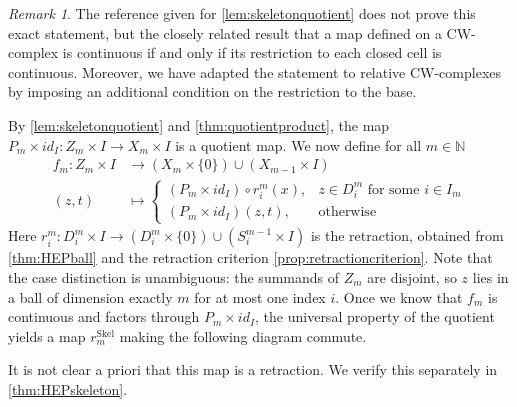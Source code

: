 \documentclass[11pt, a4paper, english]{article}
\theoremstyle{plain}
\theoremstyle{definition}
\theoremstyle{remark}
\newtheorem{remark}[theorem]{Remark}
\numberwithin{equation}{section}
\numberwithin{theorem}{section}
\begin{document}
\begin{remark}
The reference given for \cref{lem:skeletonquotient} does not prove this exact statement, but the closely related result that a map defined on a CW-complex is continuous if and only if its restriction to each closed cell is continuous. Moreover, we have adapted the statement to relative CW-complexes by imposing an additional condition on the restriction to the base.
\end{remark}

By \cref{lem:skeletonquotient} and \cref{thm:quotientproduct}, the map $P_m \times id_I \colon Z_m \times I \to X_m \times I$ is a quotient map. We now define for all $m \in \mathbb{N}$
\begin{align*} 
f_m : Z_m \times I &\to (X_m \times \{0\}) \cup (X_{m-1} \times I)  \\
    (z,t) &\mapsto
    \begin{cases}
    (P_m \times id_I) \circ r_i^m (x), & z \in D_i^m \text{ for some } i \in I_m\\
    (P_m \times id_I) (z,t), & \text{otherwise }  
    \end{cases}
\end{align*}
Here $r_i^m \colon D_i^m \times I \to (D_i^m \times \{0\}) \cup (S_i^{m-1} \times I)$ is the retraction, obtained from \cref{thm:HEPball} and the retraction criterion \cref{prop:retractioncriterion}. Note that the case distinction is unambiguous: the summands of $Z_m$ are disjoint, so $z$ lies in a ball of dimension exactly $m$ for at most one index $i$. Once we know that $f_m$ is continuous and factors through $P_m \times id_I$, the universal property of the quotient yields a map $r^{\mathrm{Skel}}_m$ making the following diagram commute.
\begin{center}
\end{center}

It is not clear a priori that this map is a retraction. We verify this separately in \cref{thm:HEPskeleton}.
\end{document}
